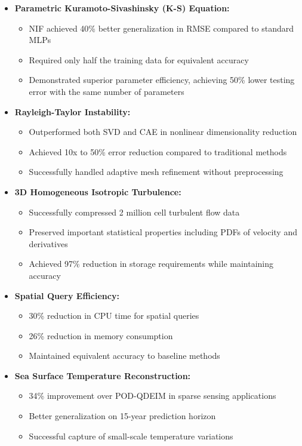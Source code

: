 \documentclass[10pt,journal,compsoc]{IEEEtran}
\begin{document}
\begin{itemize}
    \item \textbf{Parametric Kuramoto-Sivashinsky (K-S) Equation:}
    \begin{itemize}
        \item NIF achieved 40\% better generalization in RMSE compared to standard MLPs
        \item Required only half the training data for equivalent accuracy
        \item Demonstrated superior parameter efficiency, achieving 50\% lower testing error with the same number of parameters
    \end{itemize}
    
    \item \textbf{Rayleigh-Taylor Instability:}
    \begin{itemize}
        \item Outperformed both SVD and CAE in nonlinear dimensionality reduction
        \item Achieved 10x to 50\% error reduction compared to traditional methods
        \item Successfully handled adaptive mesh refinement without preprocessing
    \end{itemize}
    
    \item \textbf{3D Homogeneous Isotropic Turbulence:}
    \begin{itemize}
        \item Successfully compressed 2 million cell turbulent flow data
        \item Preserved important statistical properties including PDFs of velocity and derivatives
        \item Achieved 97\% reduction in storage requirements while maintaining accuracy
    \end{itemize}
    
    \item \textbf{Spatial Query Efficiency:}
    \begin{itemize}
        \item 30\% reduction in CPU time for spatial queries
        \item 26\% reduction in memory consumption
        \item Maintained equivalent accuracy to baseline methods
    \end{itemize}
    
    \item \textbf{Sea Surface Temperature Reconstruction:}
    \begin{itemize}
        \item 34\% improvement over POD-QDEIM in sparse sensing applications
        \item Better generalization on 15-year prediction horizon
        \item Successful capture of small-scale temperature variations
    \end{itemize}
\end{itemize}
\end{document}
